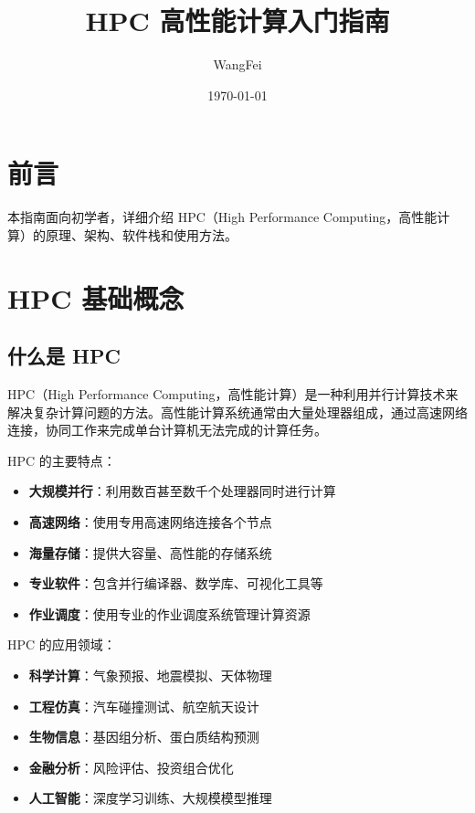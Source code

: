 \documentclass[12pt,UTF8]{ctexbook}
\title{\heiti\zihao{0} HPC 高性能计算入门指南}
\author{WangFei}
\date{\today}
\begin{document}
\maketitle
\tableofcontents

\frontmatter
\chapter{前言}

本指南面向初学者，详细介绍 HPC（High Performance Computing，高性能计算）的原理、架构、软件栈和使用方法。

\mainmatter

\chapter{HPC 基础概念}
\label{chap:hpc_basics}

\section{什么是 HPC}
\label{sec:what_is_hpc}

HPC（High Performance Computing，高性能计算）是一种利用并行计算技术来解决复杂计算问题的方法。高性能计算系统通常由大量处理器组成，通过高速网络连接，协同工作来完成单台计算机无法完成的计算任务。

HPC 的主要特点：
\begin{itemize}
    \item \textbf{大规模并行}：利用数百甚至数千个处理器同时进行计算
    \item \textbf{高速网络}：使用专用高速网络连接各个节点
    \item \textbf{海量存储}：提供大容量、高性能的存储系统
    \item \textbf{专业软件}：包含并行编译器、数学库、可视化工具等
    \item \textbf{作业调度}：使用专业的作业调度系统管理计算资源
\end{itemize}

HPC 的应用领域：
\begin{itemize}
    \item \textbf{科学计算}：气象预报、地震模拟、天体物理
    \item \textbf{工程仿真}：汽车碰撞测试、航空航天设计
    \item \textbf{生物信息}：基因组分析、蛋白质结构预测
    \item \textbf{金融分析}：风险评估、投资组合优化
    \item \textbf{人工智能}：深度学习训练、大规模模型推理
\end{itemize}
\end{document}
